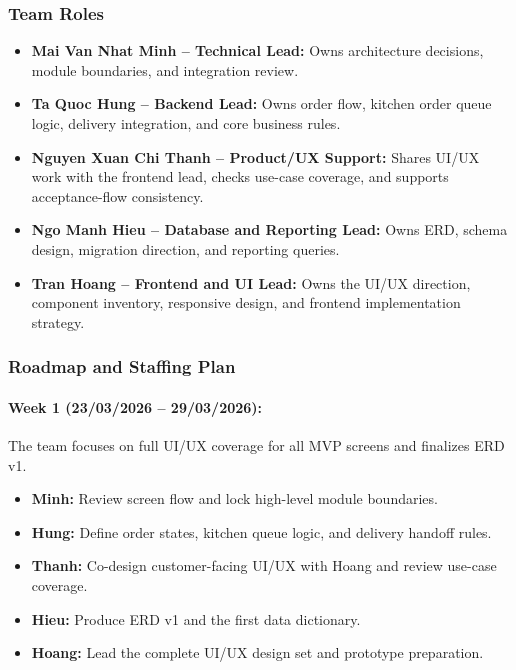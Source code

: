 \subsubsection{Team Roles}

\begin{itemize}
    \item \textbf{Mai Van Nhat Minh -- Technical Lead:} Owns architecture decisions, module boundaries, and integration review.
    \item \textbf{Ta Quoc Hung -- Backend Lead:} Owns order flow, kitchen order queue logic, delivery integration, and core business rules.
    \item \textbf{Nguyen Xuan Chi Thanh -- Product/UX Support:} Shares UI/UX work with the frontend lead, checks use-case coverage, and supports acceptance-flow consistency.
    \item \textbf{Ngo Manh Hieu -- Database and Reporting Lead:} Owns ERD, schema design, migration direction, and reporting queries.
    \item \textbf{Tran Hoang -- Frontend and UI Lead:} Owns the UI/UX direction, component inventory, responsive design, and frontend implementation strategy.
\end{itemize}

\subsubsection{Roadmap and Staffing Plan}

\paragraph{Week 1 (23/03/2026 -- 29/03/2026):} The team focuses on full UI/UX coverage for all MVP screens and finalizes ERD v1.
\begin{itemize}
    \item \textbf{Minh:} Review screen flow and lock high-level module boundaries.
    \item \textbf{Hung:} Define order states, kitchen queue logic, and delivery handoff rules.
    \item \textbf{Thanh:} Co-design customer-facing UI/UX with Hoang and review use-case coverage.
    \item \textbf{Hieu:} Produce ERD v1 and the first data dictionary.
    \item \textbf{Hoang:} Lead the complete UI/UX design set and prototype preparation.
\end{itemize}

